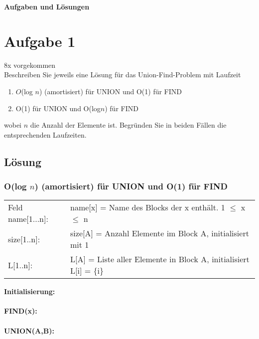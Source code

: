 \documentclass[10pt,a4paper]{article}
\begin{document}
\begin{center}
	{\huge \textbf{Aufgaben und Lösungen}}
\end{center}



\section*{Aufgabe 1}
8x vorgekommen \\
Beschreiben Sie jeweils eine Lösung für das Union-Find-Problem mit Laufzeit
\begin{enumerate}
	\item $O$(log $n$) (amortisiert) für UNION und O(1) für FIND
	\item O(1) für UNION und O(log$n$) für FIND
\end{enumerate}	
wobei $n$ die Anzahl der Elemente ist. Begründen Sie in beiden Fällen die entsprechenden Laufzeiten.

\subsection*{Lösung}
\subsubsection*{O(log $n$) (amortisiert) für UNION und O(1) für FIND}

\begin{tabular}{ll}
	Feld name[1...n]:& name[x] = Name des Blocks der x enthält. 1 $\leq$ x $\leq$ n \\
	size[1..n]:& size[A] = Anzahl Elemente im Block A, initialisiert mit 1 \\ 
	L[1..n]: & L[A] = Liste aller Elemente in Block A, initialisiert L[i] = \{i\}
\end{tabular}
\begin{algorithm}[H]
	
	\textbf{Initialisierung:}	\\
	~\\
	\textbf{FIND(x):} \\
	~\\
	\textbf{UNION(A,B):} \\
	
	
\end{algorithm}
\end{document}

